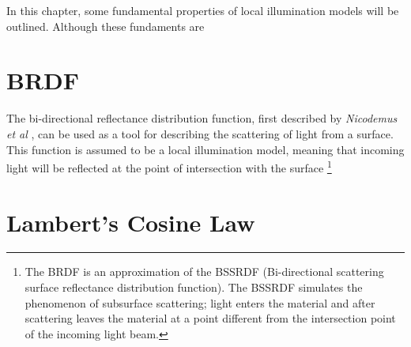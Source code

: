 \hypertarget{Fundamentals}{
}

In this chapter, some fundamental properties of local illumination models will be outlined. Although these fundaments are 

\section{BRDF}
The bi-directional reflectance distribution function, first described by {\it Nicodemus et al} \cite{Nicodemus}, can be used as a tool for describing the scattering of light from a surface. This function is assumed to be a local illumination model, meaning that incoming light will be reflected at the point of intersection with the surface \footnote{The BRDF is an approximation of the BSSRDF (Bi-directional scattering surface reflectance distribution function). The BSSRDF simulates the phenomenon of subsurface scattering; light enters the material and after scattering leaves the material at a point different from the intersection point of the incoming light beam.}

\section{Lambert's Cosine Law}
